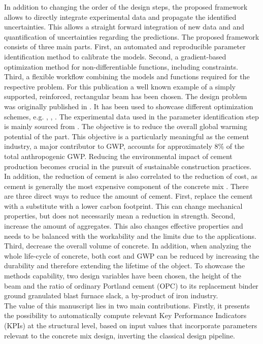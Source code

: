 In addition to changing the order of the design steps, the proposed framework allows to directly integrate experimental data and propagate the identified uncertainties.
This allows a straight forward integration of new data and and quantification of uncertainties regarding the predictions.
The proposed framework consists of three main parts.
First, an automated and reproducible parameter identification method to calibrate the models.
Second, a gradient-based optimization method for non-differentiable functions, including constraints.
Third, a flexible workflow combining the models and functions required for the respective problem. 
For this publication a well known example of a simply supported, reinforced, rectangular beam  has been chosen.
The design problem was originally published in \cite{everard1966reinforced}.
It has been used to showcase different optimization schemes, e.g. \cite{Chakrabarty_1992}, \cite{Coello_1997}, \cite{Pierott_2021}.
The experimental data used in the parameter identification step is mainly sourced from \cite{gruyaert2011}.
The objective is to reduce the overall global warming potential of the part.
This objective is a particularly meaningful as the cement industry, a major contributor to GWP, accounts for approximately 8\% of the total anthropogenic GWP. 
Reducing the environmental impact of cement production becomes crucial in the pursuit of sustainable construction practices.
In addition, the reduction of cement is also correlated to the reduction of cost, as cement is generally the most expensive component of the concrete mix \cite{Paya_Zaforteza_2009}.
There are three direct ways to reduce the amount of cement.
First, replace the cement with a substitute with a lower carbon footprint.
This can change mechanical properties, but does not necessarily mean a reduction in strength.
Second, increase the amount of aggregates.
This also changes effective properties and needs to be balanced with the workability and the limits due to the applications.
Third, decrease the overall volume of concrete.
In addition, when analyzing the whole life-cycle of concrete, both cost and GWP can be reduced by increasing the durability and therefore extending the lifetime of the object.
To showcase the methods capability, two design variables have been chosen, the height of the beam and the ratio of ordinary Portland cement (OPC) to its replacement binder ground granulated blast furnace slack, a by-product of iron industry.\\
%
The value of this manuscript lies in two main contributions. 
Firstly, it presents the possibility to automatically compute relevant Key Performance Indicators (KPIs) at the structural level, based on input values that incorporate parameters relevant to the concrete mix design, inverting the classical design pipeline.
